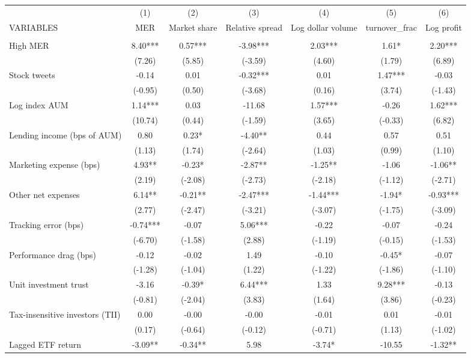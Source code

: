\documentclass[]{article}
\begin{document}
\begin{tabular}{lcccccc} \hline
 & (1) & (2) & (3) & (4) & (5) & (6) \\
VARIABLES & MER & Market share & Relative spread & Log dollar volume & turnover\_frac & Log profit \\ \hline
 &  &  &  &  &  &  \\
High MER & 8.40*** & 0.57*** & -3.98*** & 2.03*** & 1.61* & 2.20*** \\
 & (7.26) & (5.85) & (-3.59) & (4.60) & (1.79) & (6.89) \\
Stock tweets & -0.14 & 0.01 & -0.32*** & 0.01 & 1.47*** & -0.03 \\
 & (-0.95) & (0.50) & (-3.68) & (0.16) & (3.74) & (-1.43) \\
Log index AUM & 1.14*** & 0.03 & -11.68 & 1.57*** & -0.26 & 1.62*** \\
 & (10.74) & (0.44) & (-1.59) & (3.65) & (-0.33) & (6.82) \\
Lending income (bps of AUM) & 0.80 & 0.23* & -4.40** & 0.44 & 0.57 & 0.51 \\
 & (1.13) & (1.74) & (-2.64) & (1.03) & (0.99) & (1.10) \\
Marketing expense (bps) & 4.93** & -0.23* & -2.87** & -1.25** & -1.06 & -1.06** \\
 & (2.19) & (-2.08) & (-2.73) & (-2.18) & (-1.12) & (-2.71) \\
Other net expenses & 6.14** & -0.21** & -2.47*** & -1.44*** & -1.94* & -0.93*** \\
 & (2.77) & (-2.47) & (-3.21) & (-3.07) & (-1.75) & (-3.09) \\
Tracking error (bps) & -0.74*** & -0.07 & 5.06*** & -0.22 & -0.07 & -0.24 \\
 & (-6.70) & (-1.58) & (2.88) & (-1.19) & (-0.15) & (-1.53) \\
Performance drag (bps) & -0.12 & -0.02 & 1.49 & -0.10 & -0.45* & -0.07 \\
 & (-1.28) & (-1.04) & (1.22) & (-1.22) & (-1.86) & (-1.10) \\
Unit investment trust & -3.16 & -0.39* & 6.44*** & 1.33 & 9.28*** & -0.13 \\
 & (-0.81) & (-2.04) & (3.83) & (1.64) & (3.86) & (-0.23) \\
Tax-insensitive investors (TII) & 0.00 & -0.00 & -0.00 & -0.01 & 0.01 & -0.01 \\
 & (0.17) & (-0.64) & (-0.12) & (-0.71) & (1.13) & (-1.02) \\
Lagged ETF return & -3.09** & -0.34** & 5.98 & -3.74* & -10.55 & -1.32** \\

\end{tabular}
\end{document}

